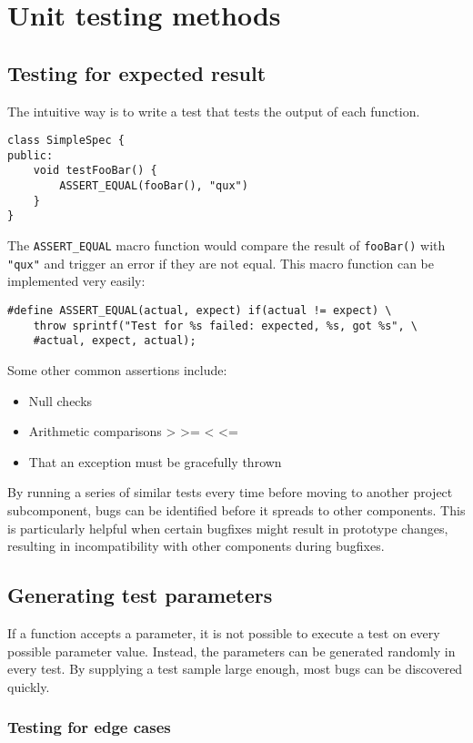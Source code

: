 \section{Unit testing methods}
\subsection{Testing for expected result}
The intuitive way is to write a test that tests the output of each function.

\begin{lstlisting}[style=Cpp]
class SimpleSpec {
public:
	void testFooBar() {
		ASSERT_EQUAL(fooBar(), "qux")
	}
}
\end{lstlisting}

The \texttt{ASSERT\_EQUAL} macro function would compare the result of \texttt{fooBar()} with \texttt{"qux"} and trigger an error if they are not equal.
This macro function can be implemented very easily:

\begin{lstlisting}[style=Cpp]
#define ASSERT_EQUAL(actual, expect) if(actual != expect) \
	throw sprintf("Test for %s failed: expected, %s, got %s", \
	#actual, expect, actual);
\end{lstlisting}

Some other common assertions include:
\begin{itemize}
	\item Null checks
	\item Arithmetic comparisons > >= < <=
	\item That an exception must be gracefully thrown
\end{itemize}

By running a series of similar tests every time before moving to another project subcomponent,
bugs can be identified before it spreads to other components.
This is particularly helpful when certain bugfixes might result in prototype changes,
resulting in incompatibility with other components during bugfixes.

\subsection{Generating test parameters}
If a function accepts a parameter, it is not possible to execute a test on every possible parameter value.
Instead, the parameters can be generated randomly in every test.
By supplying a test sample large enough, most bugs can be discovered quickly.


\subsubsection{Testing for edge cases}
